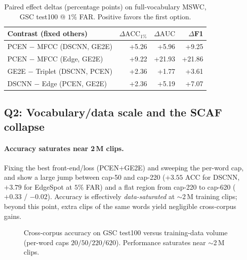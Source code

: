 \documentclass[10pt,twocolumn]{article}
\newcommand{\acc}{\text{ACC}}
\newcommand{\auc}{\text{AUC}}
\begin{document}
\begin{table}[t]
\centering
\caption{Paired effect deltas (percentage points) on full-vocabulary MSWC,
GSC test100 @ $1\%$ FAR. Positive favors the first option.}
\label{tab:deltas}
\footnotesize
\setlength{\tabcolsep}{4pt}
\begin{tabular}{l r r r}
\toprule
\textbf{Contrast (fixed others)} & $\Delta\acc_{1\%}$ & $\Delta\auc$ & $\Delta$F1\\
\midrule
PCEN $-$ MFCC \;(DSCNN, GE2E)      & +5.26 & +5.96 & +9.25 \\
PCEN $-$ MFCC \;(Edge, GE2E)       & +9.22 & +21.93 & +21.86 \\
GE2E $-$ Triplet \;(DSCNN, PCEN)   & +2.36 & +1.77 & +3.61 \\
DSCNN $-$ Edge \;(PCEN, GE2E)      & +2.36 & +5.19 & +7.07 \\
\bottomrule
\end{tabular}
\end{table}

\subsection{Q2: Vocabulary/data scale and the SCAF collapse}
\label{sec:scale}

\paragraph{Accuracy saturates near 2\,M clips.}
Fixing the best front-end/loss (PCEN$+$GE2E) and sweeping the per-word cap,
 and  show a large jump between cap-50 and
cap-220 ($+3.55$ ACC for DSCNN, $+3.79$ for EdgeSpot at $5\%$ FAR) and a flat
region from cap-220 to cap-620 ($+0.33$ / $-0.02$). Accuracy is effectively
\emph{data-saturated} at $\sim$2\,M training clips; beyond this point, extra
clips of the same words yield negligible cross-corpus gains.

\begin{figure}[t]
\centering
{}
\caption{Cross-corpus accuracy on GSC test100 versus training-data volume
(per-word caps $20/50/220/620$). Performance saturates near $\sim$2\,M clips.}
\label{fig:scale}
\end{figure}
\end{document}
